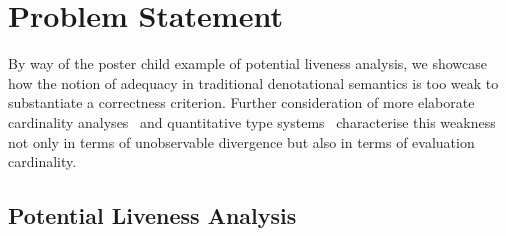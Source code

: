 \section{Problem Statement}
\label{sec:problem}

By way of the poster child example of potential liveness analysis, we showcase
how the notion of adequacy in traditional denotational semantics is too weak
to substantiate a correctness criterion. Further consideration of more elaborate
cardinality analyses~\cite{cardinality} and quantitative type
systems~\cite{Atkey:18} characterise this weakness not only in terms of
unobservable divergence but also in terms of evaluation cardinality.

%
%

\subsection{Potential Liveness Analysis}

